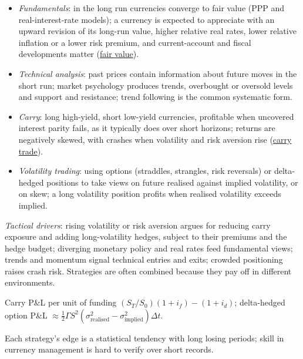 \begin{qfmethod}\label{meth:active-currency-strategies}
 \citep[chap.~8, sec.~5, pp.~396--404]{portfolio-management-in-practice-v1-2020}
\begin{itemize}
\item \emph{Fundamentals}: in the long run currencies converge to fair value (PPP and real-interest-rate models); a currency is expected to appreciate with an upward revision of its long-run value, higher relative real rates, lower relative inflation or a lower risk premium, and current-account and fiscal developments matter (\hyperref[meth:exchange-rate-forecasting-fair-value]{fair value}).
\item \emph{Technical analysis}: past prices contain information about future moves in the short run; market psychology produces trends, overbought or oversold levels and support and resistance; trend following is the common systematic form.
\item \emph{Carry}: long high-yield, short low-yield currencies, profitable when uncovered interest parity fails, as it typically does over short horizons; returns are negatively skewed, with crashes when volatility and risk aversion rise (\hyperref[meth:carry-trade-uip]{carry trade}).
\item \emph{Volatility trading}: using options (straddles, strangles, risk reversals) or delta-hedged positions to take views on future realised against implied volatility, or on skew; a long volatility position profits when realised volatility exceeds implied.
\end{itemize}
\emph{Tactical drivers}: rising volatility or risk aversion argues for reducing carry exposure and adding long-volatility hedges, subject to their premiums and the hedge budget; diverging monetary policy and real rates feed fundamental views; trends and momentum signal technical entries and exits; crowded positioning raises crash risk. Strategies are often combined because they pay off in different environments.

 Carry P\&L per unit of funding $(S_T/S_0)(1+i_f)-(1+i_d)$; delta-hedged option P\&L $\approx\tfrac12\Gamma S^2(\sigma^2_{\text{realised}}-\sigma^2_{\text{implied}})\Delta t$.

 Each strategy's edge is a statistical tendency with long losing periods; skill in currency management is hard to verify over short records.


\end{qfmethod}
